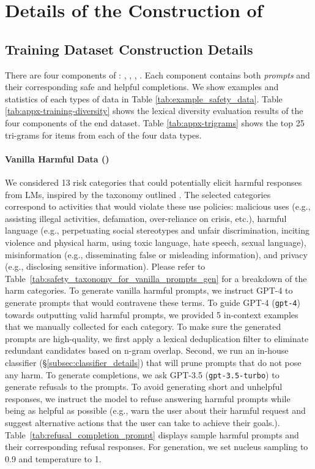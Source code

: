 \section{Details of the Construction of \dataset}

\subsection{\dataset Training Dataset Construction Details}
\label{assec:dataset_construction_details}

There are four components of \dataset: \advh, \advb, \vanih, \vanib. Each component contains both \textit{prompts} and their corresponding safe and helpful completions. We show examples and statistics of each types of data in Table \ref{tab:example_safety_data}. Table \ref{tab:appx-training-diversity} shows the lexical diversity evaluation results of the four components of the end \dataset dataset. Table \ref{tab:appx-trigrams} shows the top 25 tri-grams for items from each of the four data types.

\paragraph{Vanilla Harmful Data (\vanih)}

We considered 13 risk categories that could potentially elicit harmful responses from LMs, inspired by the taxonomy outlined \citet{weidinger2022taxonomy}. The selected categories correspond to activities that would violate these use policies: malicious uses (e.g., assisting illegal activities, defamation, over-reliance on crisis, etc.), harmful language (e.g., perpetuating social stereotypes and unfair discrimination, inciting violence and physical harm, using toxic language, hate speech, sexual language), misinformation (e.g., disseminating false or misleading information), and privacy (e.g., disclosing sensitive information). Please refer to Table~\ref{tab:safety_taxonomy_for_vanilla_prompts_gen} for a breakdown of the harm categories.
To generate vanilla harmful prompts, we instruct GPT-4 to generate prompts that would contravene these terms. To guide GPT-4  (\texttt{gpt-4}) towards outputting valid harmful prompts, we provided 5 in-context examples that we manually collected for each category. To make sure the generated prompts are high-quality, we first apply a lexical deduplication filter to eliminate redundant candidates based on n-gram overlap. Second, we run an in-house classifier (\S\ref{subsec:classifier_details}) that will prune prompts that do not pose any harm. To generate completions, we ask GPT-3.5 (\texttt{gpt-3.5-turbo}) to generate refusals to the prompts. To avoid generating short and unhelpful responses, we instruct the model to refuse answering harmful prompts while being as helpful as possible (e.g., warn the user about their harmful request and suggest alternative actions that the user can take to achieve their goals.). Table~\ref{tab:refusal_completion_prompt} displays sample harmful prompts and their corresponding refusal responses. For generation, we set nucleus sampling to 0.9 and temperature to 1. 


